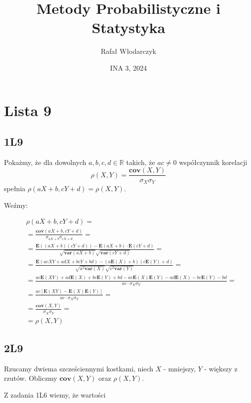 \documentclass{article}
\title{Metody Probabilistyczne i Statystyka}
\author{Rafał Włodarczyk}
\date{INA 3, 2024}
\numberwithin{equation}{subsection}
\begin{document}
\maketitle

\tableofcontents

\newpage

\section{Lista 9}

\subsection{1L9}

Pokażmy, że dla dowolnych $a,b,c,d\in\mathbb{R}$ takich, że $ac \neq 0$ współczynnik korelacji
\[
\rho(X,Y) = \frac{\mathbf{cov}(X,Y)}{\sigma_X \sigma_Y}
\]
spełnia $\rho(aX + b, cY + d) = \rho(X,Y)$.

\noindent
Weźmy:

\begin{align}
    &\rho(aX+b,cY+d) =\\
    &= \frac{\mathbf{cov}(aX+b, cY+d)}{\sigma_{aX+b} \sigma_{cX+d}} = \\
    &= \frac{\mathbf{E}((aX+b)(cY+d)) - \mathbf{E}(aX+b)\cdot\mathbf{E}(cY+d)}{\sqrt{\mathbf{var}(aX+b)}\sqrt{\mathbf{var}(cY+d)}}=\\
    &= \frac{\mathbf{E}(acXY+adX+bcY+bd) - (a\mathbf{E}(X)+b)(c\mathbf{E}(Y)+d)}{\sqrt{a^2\mathbf{var}(X)}\sqrt{c^2\mathbf{var}(Y)}} =\\
    &= \frac{ac\mathbf{E}(XY)+ad\mathbf{E}(X)+bc\mathbf{E}(Y)+bd - ac\mathbf{E}(X)\mathbf{E}(Y) - ad\mathbf{E}(X) - bc\mathbf{E}(Y) - bd}{ac\cdot \sigma_X \sigma_Y} =\\
    &= \frac{ac\left[\mathbf{E}(XY)-\mathbf{E}(X)\mathbf{E}(Y)\right]}{ac\cdot \sigma_X \sigma_Y} =\\
    &= \frac{\mathbf{cov}(X,Y)}{\sigma_X \sigma_Y} =\\
    &= \rho(X,Y)
\end{align}

\subsection{2L9}

Rzucamy dwiema szcześciennymi kostkami, niech $X$ - mniejszy, $Y$ - większy z rzutów. Obliczmy $\mathbf{cov}(X,Y)$ oraz $\rho(X,Y)$.

\noindent
Z zadania 1L6 wiemy, że wartości 
\end{document}
